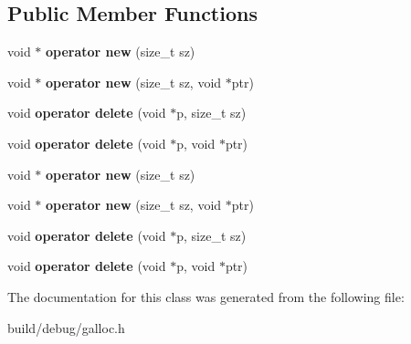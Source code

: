 \subsection*{Public Member Functions}
\begin{DoxyCompactItemize}
\item 
\hypertarget{classGlobAlloc_acb2be4eaf93b490cf8c419aeccb53cee}{void $\ast$ {\bfseries operator new} (size\-\_\-t sz)}\label{classGlobAlloc_acb2be4eaf93b490cf8c419aeccb53cee}

\item 
\hypertarget{classGlobAlloc_ac16473b410af2b03d37dbdc97e43e629}{void $\ast$ {\bfseries operator new} (size\-\_\-t sz, void $\ast$ptr)}\label{classGlobAlloc_ac16473b410af2b03d37dbdc97e43e629}

\item 
\hypertarget{classGlobAlloc_aabc8fd6722597a3cfe37cf36352e304c}{void {\bfseries operator delete} (void $\ast$p, size\-\_\-t sz)}\label{classGlobAlloc_aabc8fd6722597a3cfe37cf36352e304c}

\item 
\hypertarget{classGlobAlloc_a53bb1bf97b9034b956963fae5b710d3a}{void {\bfseries operator delete} (void $\ast$p, void $\ast$ptr)}\label{classGlobAlloc_a53bb1bf97b9034b956963fae5b710d3a}

\item 
\hypertarget{classGlobAlloc_acb2be4eaf93b490cf8c419aeccb53cee}{void $\ast$ {\bfseries operator new} (size\-\_\-t sz)}\label{classGlobAlloc_acb2be4eaf93b490cf8c419aeccb53cee}

\item 
\hypertarget{classGlobAlloc_ac16473b410af2b03d37dbdc97e43e629}{void $\ast$ {\bfseries operator new} (size\-\_\-t sz, void $\ast$ptr)}\label{classGlobAlloc_ac16473b410af2b03d37dbdc97e43e629}

\item 
\hypertarget{classGlobAlloc_aabc8fd6722597a3cfe37cf36352e304c}{void {\bfseries operator delete} (void $\ast$p, size\-\_\-t sz)}\label{classGlobAlloc_aabc8fd6722597a3cfe37cf36352e304c}

\item 
\hypertarget{classGlobAlloc_a53bb1bf97b9034b956963fae5b710d3a}{void {\bfseries operator delete} (void $\ast$p, void $\ast$ptr)}\label{classGlobAlloc_a53bb1bf97b9034b956963fae5b710d3a}

\end{DoxyCompactItemize}


The documentation for this class was generated from the following file\-:\begin{DoxyCompactItemize}
\item 
build/debug/galloc.\-h\end{DoxyCompactItemize}
